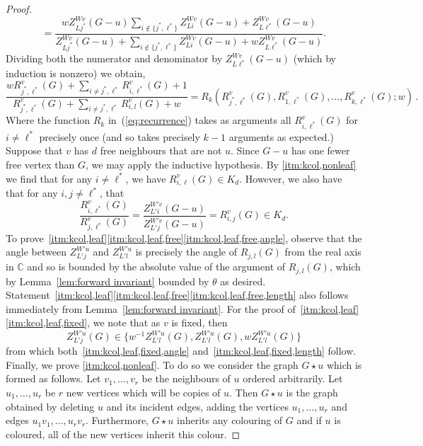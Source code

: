 \documentclass[10pt,a4paper]{article}
\theoremstyle{definition}
\newcommand*{\CC}{\mathbb{C}}
\begin{document}
\begin{proof}
\[ =\frac{wZ^{Wv}_{Lj^*}(G-u)\sum_{i\notin\{ j^*,\ell^*\}}Z^{Wv}_{Li}(G-u)+Z^{Wv}_{L\ell^*}(G-u)}{Z^{Wv}_{Lj^*}(G-u)+\sum_{i\notin\{ j^*,\ell^*\}}Z^{Wv}_{Li}(G-u)+wZ^{Wv}_{L\ell^*}(G-u)}.
 \]
 Dividing both the numerator and denominator by $Z^{Wv}_{L\ell^*}(G-u)$ (which by induction is nonzero) we obtain,
 \begin{equation}
 \dfrac{w R_{j^*,\ell^*}^v(G) + \sum_{i \neq j^*, \ell^*} R_{i,\ell^*}^v(G) +1}{R_{j^*,\ell^*}^v(G) +\sum_{i \neq j^*,\ell^*} R_{i,l}^v(G)+w} = R_k(R_{j^*,\ell^*}^v(G), R_{1,\ell^*}^v(G), \dotsc, R_{k,\ell^*}^v(G);w)\,.
 \label{eq:recurrence}
\end{equation}
Where the function $R_k$ in~(\ref{eq:recurrence}) takes as arguments all $R^v_{i,\ell^*}(G)$ for $i \neq \ell^*$ precisely once (and so takes precisely $k-1$ arguments as expected.)
%
Suppose that $v$ has $d$ free neighbours that are not $u$.
Since $G -u$ has one fewer free vertex than $G$, we may apply the inductive hypothesis.
By \ref{itm:kcol,nonleaf} we find that for any $i\neq \ell^*$, we have $R^v_{i,\ell}(G)\in K_d$.
However, we also have that for any $i,j\neq \ell^*$, that 
\[
\frac{R^v_{i,\ell^*}(G)}{R^v_{j,\ell^*}(G)}=\frac{Z_{L'i}^{W'v}(G- u)}{Z_{L'j}^{W'v}(G- u)}=R^v_{i,j}(G)\in K_d.
\]
To prove~\ref{itm:kcol,leaf}\ref{itm:kcol,leaf,free}\ref{itm:kcol,leaf,free,angle}, observe that the angle between $Z_{L'j}^{W'u}$ and $Z_{L'l}^{W'u}$ is precisely the angle of $R_{j,l}(G)$ from the real axis in $\CC$ and so is bounded by the absolute value of the argument of $R_{j,l}(G)$, which by Lemma~\ref{lem:forward invariant} bounded by $\theta$ as desired.
Statement~\ref{itm:kcol,leaf}\ref{itm:kcol,leaf,free}\ref{itm:kcol,leaf,free,length} also follows immediately from Lemma~\ref{lem:forward invariant}.
%
For the proof of~\ref{itm:kcol,leaf}\ref{itm:kcol,leaf,fixed}, we note that as $v$ is fixed, then 
$$
Z_{L'j}^{W'u}(G) \in \{ w^{-1} Z_{L'l}^{W'u}(G),Z_{L'l}^{W'u}(G),wZ_{L'l}^{W'u}(G) \}
$$
from which both~\ref{itm:kcol,leaf,fixed,angle} and~\ref{itm:kcol,leaf,fixed,length} follow.
%
Finally, we prove \ref{itm:kcol,nonleaf}.
To do so we consider the graph $G \star u$ which is formed as follows.
Let $v_1, \ldots, v_r$ be the neighbours of $u$ ordered arbitrarily.
Let $u_1, \ldots, u_r$ be $r$ new vertices which will be copies of $u$.
Then $G \star u$ is the graph obtained by deleting $u$ and its incident edges, adding the vertices $u_1, \ldots, u_r$ and edges $u_1v_1, \ldots, u_rv_r$.
Furthermore, $G \star u$ inherits any colouring of $G$ and if $u$ is coloured, all of the new vertices inherit this colour.

\end{proof}
\end{document}
